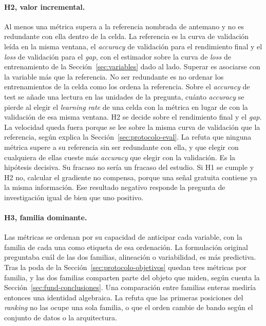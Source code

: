 \paragraph{H2, valor incremental.} Al menos una métrica supera a la referencia nombrada de antemano y no es redundante con ella dentro de la celda. La referencia es la curva de validación leída en la misma ventana, el \emph{accuracy} de validación para el rendimiento final y el \emph{loss} de validación para el \emph{gap}, con el estimador sobre la curva de \emph{loss} de entrenamiento de la Sección~\ref{sec:variables} dado al lado. Superar es asociarse con la variable más que la referencia. No ser redundante es no ordenar los entrenamientos de la celda como los ordena la referencia. Sobre el \emph{accuracy} de test se añade una lectura en las unidades de la pregunta, cuánto \emph{accuracy} se pierde al elegir el \emph{learning rate} de una celda con la métrica en lugar de con la validación de esa misma ventana. H2 se decide sobre el rendimiento final y el \emph{gap}. La velocidad queda fuera porque se lee sobre la misma curva de validación que la referencia, según explica la Sección~\ref{sec:protocolo-eval}. La refuta que ninguna métrica supere a su referencia sin ser redundante con ella, y que elegir con cualquiera de ellas cueste más \emph{accuracy} que elegir con la validación. Es la hipótesis decisiva. Su fracaso no sería un fracaso del estudio. Si H1 se cumple y H2 no, calcular el gradiente no compensa, porque una señal gratuita contiene ya la misma información. Ese resultado negativo responde la pregunta de investigación igual de bien que uno positivo.

\paragraph{H3, familia dominante.} Las métricas se ordenan por su capacidad de anticipar cada variable, con la familia de cada una como etiqueta de esa ordenación. La formulación original preguntaba cuál de las dos familias, alineación o variabilidad, es más predictiva. Tras la poda de la Sección~\ref{sec:protocolo-objetivos} quedan tres métricas por familia, y las dos familias comparten parte del objeto que miden, según cuenta la Sección~\ref{sec:fund-conclusiones}. Una comparación entre familias enteras mediría entonces una identidad algebraica. La refuta que las primeras posiciones del \emph{ranking} no las ocupe una sola familia, o que el orden cambie de bando según el conjunto de datos o la arquitectura.

